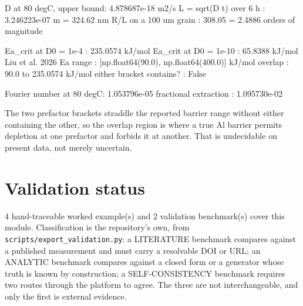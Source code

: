 \documentclass[10pt,a4paper,twoside]{report}
\begin{document}
\begin{outputblock}
D at 80 degC, upper bound: 4.878687e-18 m2/s
L = sqrt(D t) over 6 h   : 3.246223e-07 m = 324.62 nm
R/L on a 100 um grain    : 308.05 = 2.4886 orders of magnitude

Ea_crit at D0 = 1e-4     : 235.0574 kJ/mol
Ea_crit at D0 = 1e-10    : 65.8388 kJ/mol
Liu et al. 2026 Ea range : [np.float64(90.0), np.float64(400.0)] kJ/mol
overlap                  : 90.0 to 235.0574 kJ/mol
either bracket contains? : False

Fourier number at 80 degC: 1.053796e-05
fractional extraction    : 1.095730e-02
\end{outputblock}

The two prefactor brackets straddle the reported barrier range without either containing the other, so the overlap region is where a true Al barrier permits depletion at one prefactor and forbids it at another. That is undecidable on present data, not merely uncertain.

\section{Validation status}

4 hand-traceable worked example(s) and 2 validation benchmark(s) cover this module. Classification is the repository's own, from \texttt{scripts/export\_validation.py}: a LITERATURE benchmark compares against a published measurement and must carry a resolvable DOI or URL; an ANALYTIC benchmark compares against a closed form or a generator whose truth is known by construction; a SELF-CONSISTENCY benchmark requires two routes through the platform to agree. The three are not interchangeable, and only the first is external evidence.

\footnotesize
\end{document}
